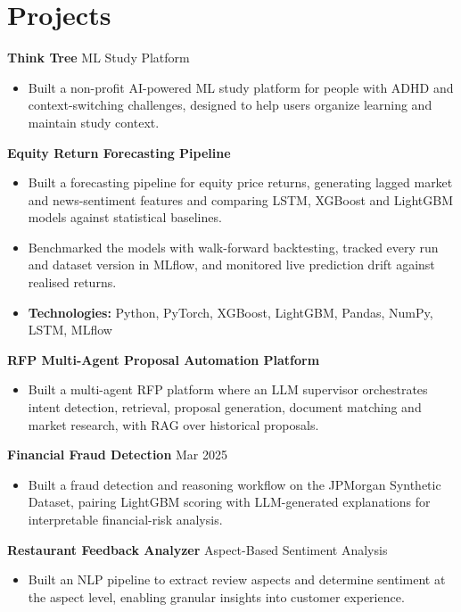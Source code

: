 \documentclass[10pt,a4paper]{article}
\begin{document}
\section{Projects}
\textbf{Think Tree} \textbar{} ML Study Platform\par
\begin{itemize}
  \item Built a non-profit AI-powered ML study platform for people with ADHD and context-switching challenges, designed to help users organize learning and maintain study context.
\end{itemize}
\textbf{Equity Return Forecasting Pipeline}\par
\begin{itemize}
  \item Built a forecasting pipeline for equity price returns, generating lagged market and news-sentiment features and comparing LSTM, XGBoost and LightGBM models against statistical baselines.
  \item Benchmarked the models with walk-forward backtesting, tracked every run and dataset version in MLflow, and monitored live prediction drift against realised returns.
  \item \textbf{Technologies:} Python, PyTorch, XGBoost, LightGBM, Pandas, NumPy, LSTM, MLflow
\end{itemize}
\textbf{RFP Multi-Agent Proposal Automation Platform}\par
\begin{itemize}
  \item Built a multi-agent RFP platform where an LLM supervisor orchestrates intent detection, retrieval, proposal generation, document matching and market research, with RAG over historical proposals.
\end{itemize}
\textbf{Financial Fraud Detection} \textbar{} Mar 2025\par
\begin{itemize}
  \item Built a fraud detection and reasoning workflow on the JPMorgan Synthetic Dataset, pairing LightGBM scoring with LLM-generated explanations for interpretable financial-risk analysis.
\end{itemize}
\textbf{Restaurant Feedback Analyzer} \textbar{} Aspect-Based Sentiment Analysis\par
\begin{itemize}
  \item Built an NLP pipeline to extract review aspects and determine sentiment at the aspect level, enabling granular insights into customer experience.
\end{itemize}
\end{document}
